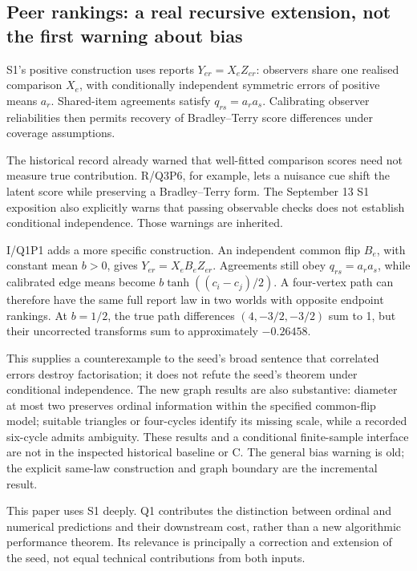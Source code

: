 \documentclass[11pt,a4paper]{article}
\begin{document}
\subsection{Peer rankings: a real recursive extension, not the first warning about bias}

S1's positive construction uses reports $Y_{er}=X_eZ_{er}$: observers share
one realised comparison $X_e$, with conditionally independent symmetric
errors of positive means $a_r$. Shared-item agreements satisfy
$q_{rs}=a_ra_s$. Calibrating observer reliabilities then permits recovery
of Bradley--Terry score differences under coverage assumptions.

The historical record already warned that well-fitted comparison scores need
not measure true contribution. R/Q3P6, for example, lets a nuisance cue shift
the latent score while preserving a Bradley--Terry form. The September 13
S1 exposition also explicitly warns that passing observable checks does not
establish conditional independence. Those warnings are inherited.

I/Q1P1 adds a more specific construction. An independent common flip $B_e$,
with constant mean $b>0$, gives $Y_{er}=X_eB_eZ_{er}$. Agreements still obey
$q_{rs}=a_ra_s$, while calibrated edge means become
$b\tanh((c_i-c_j)/2)$. A four-vertex path can therefore have the same full
report law in two worlds with opposite endpoint rankings. At $b=1/2$,
the true path differences $(4,-3/2,-3/2)$ sum to 1, but their uncorrected
transforms sum to approximately $-0.26458$.

This supplies a counterexample to the seed's broad sentence that correlated
errors destroy factorisation; it does not refute the seed's theorem under
conditional independence. The new graph results are also substantive:
diameter at most two preserves ordinal information within the specified
common-flip model; suitable triangles or four-cycles identify its missing
scale, while a recorded six-cycle admits ambiguity. These results and a
conditional finite-sample interface are not in the inspected historical
baseline or C. The general bias warning is old; the explicit same-law
construction and graph boundary are the incremental result.

This paper uses S1 deeply. Q1 contributes the distinction between ordinal
and numerical predictions and their downstream cost, rather than a new
algorithmic performance theorem. Its relevance is principally a correction
and extension of the seed, not equal technical contributions from both inputs.
\end{document}
